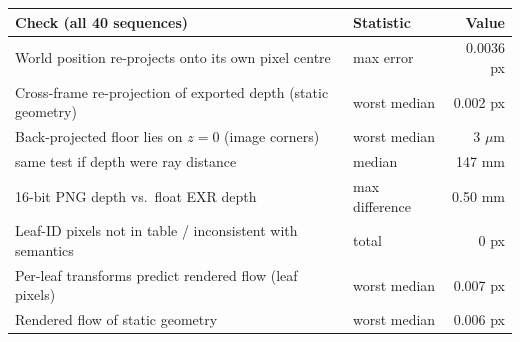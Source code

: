 \begin{tabular}{llr}
\toprule
Check (all 40 sequences) & Statistic & Value \\
\midrule
World position re-projects onto its own pixel centre & max error & 0.0036 px \\
Cross-frame re-projection of exported depth (static geometry) & worst median & 0.002 px \\
Back-projected floor lies on $z=0$ (image corners) & worst median & 3 $\mu$m \\
\quad same test if depth were ray distance & median & 147 mm \\
16-bit PNG depth vs.\ float EXR depth & max difference & 0.50 mm \\
Leaf-ID pixels not in table / inconsistent with semantics & total & 0 px \\
Per-leaf transforms predict rendered flow (leaf pixels) & worst median & 0.007 px \\
Rendered flow of static geometry & worst median & 0.006 px \\
\bottomrule
\end{tabular}
